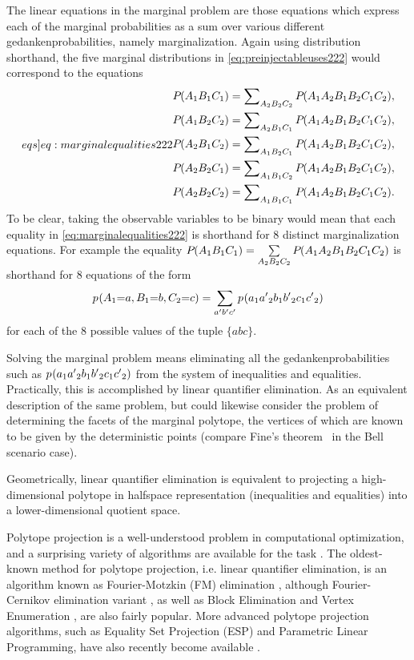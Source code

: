 {The linear equations in the marginal problem are those equations which express each of the marginal probabilities as a sum over various different gedankenprobabilities, namely marginalization. Again using distribution shorthand, the five marginal distributions in \cref{eq:preinjectableuses222} would correspond to the equations
\begin{align}\label[eqs]{eq:marginalequalities222}
\begin{split}
&\pdf{A_1 B_1 C_1} = \sum\nolimits_{A_2 B_2 C_2}\pdf{A_1 A_2 B_1 B_2 C_1 C_2},\\
&\pdf{A_1 B_2 C_2} = \sum\nolimits_{A_2 B_1 C_1}\pdf{A_1 A_2 B_1 B_2 C_1 C_2},\\
&\pdf{A_2 B_1 C_2} = \sum\nolimits_{A_1 B_2 C_1}\pdf{A_1 A_2 B_1 B_2 C_1 C_2},\\
&\pdf{A_2 B_2 C_1} = \sum\nolimits_{A_1 B_1 C_2}\pdf{A_1 A_2 B_1 B_2 C_1 C_2},\\
&\pdf{A_2 B_2 C_2} = \sum\nolimits_{A_1 B_1 C_1}\pdf{A_1 A_2 B_1 B_2 C_1 C_2}.
\end{split}
\end{align}
To be clear, taking the observable variables to be binary would mean that each equality in \cref{eq:marginalequalities222} is shorthand for 8 distinct marginalization equations. For example the equality ${P_{}}\lparen A_1 B_1 C_1\rparen = \sum\limits_{A_2 B_2 C_2}{P_{}}\lparen A_1 A_2 B_1 B_2 C_1 C_2\rparen$ is shorthand for 8 equations of the form
\begin{align}
{p_{}}\lparen A_1\mathord{=} a,  B_1\mathord{=} b, C_2\mathord{=} c\rparen = \sum\limits_{a' b' c'}{p_{}}\lparen a_1 {a'}_2 {b}_1 {b'}_2 {c}_1 {c'}_2\rparen
\end{align}
for each of the 8 possible values of the tuple $\{a b c\}$.

Solving the marginal problem means eliminating all the gedankenprobabilities such as ${p_{}}\lparen a_1 {a'}_2 {b}_1 {b'}_2 {c}_1 {c'}_2\rparen$ from the system of inequalities and equalities. Practically, this is accomplished by linear quantifier elimination. As an equivalent description of the same problem, but could likewise consider the problem of determining the facets of the marginal polytope, the vertices of which are known to be given by the deterministic points (compare Fine's theorem~\cite{FineTheorem} in the Bell scenario case).

Geometrically, linear quantifier elimination is equivalent to projecting a high-dimensional polytope in halfspace representation (inequalities and equalities) into a lower-dimensional quotient space.

Polytope projection is a well-understood problem in computational optimization, and a surprising variety of algorithms are available for the task \cite{jones2004equality,JonesThesis2005,Jones2008}. The oldest-known method for polytope projection, i.e. linear quantifier elimination, is an algorithm known as Fourier-Motzkin (FM) elimination \cite{fordan1999projection,DantzigEaves}, although Fourier-Cernikov elimination variant \cite{Shapot2012,Bastrakov2015}, as well as Block Elimination and Vertex Enumeration \cite{Avis2000lrs}, are also fairly popular. More advanced polytope projection algorithms, such as Equality Set Projection (ESP) and Parametric Linear Programming, have also recently become available \cite{jones2004equality,JonesThesis2005,Jones2008}. 

}
